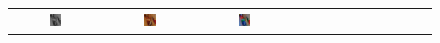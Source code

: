 \documentclass[10pt,twocolumn,letterpaper]{article}
\def\acollumsize{0.14\textwidth}
\begin{document}
\begin{figure}[t!]
\begin{center}
\begin{tabular}{ ccccccccccccc }
\includegraphics[width=\acollumsize]{img/result/21_in.JPEG}&
\includegraphics[width=\acollumsize]{img/result/21.png}&
\includegraphics[width=\acollumsize]{img/result/21_gt.JPEG}& \\


\end{tabular}
\end{center}
\end{figure}
\end{document}
